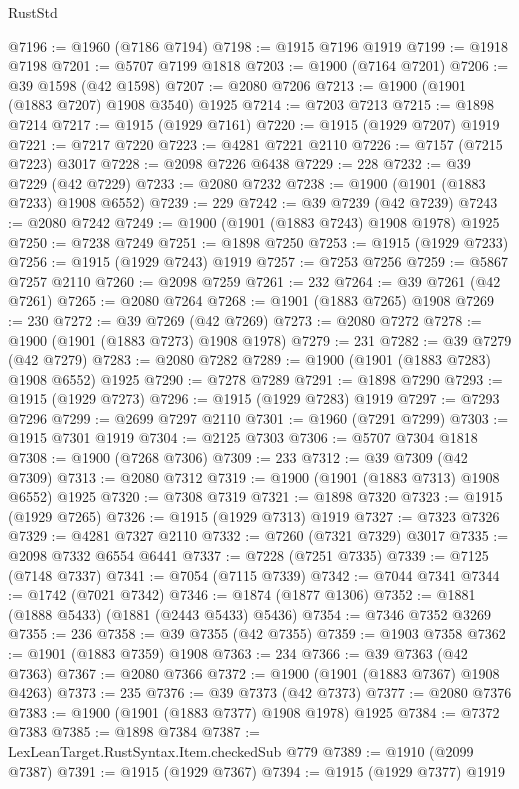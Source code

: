 \begin{lexlean}{RustStd}
\begin{coremodule}
{\begin{coremodule}
{{{{{{{{{{{{{{{{{{{{{{{{{{{{{{{{{{{{{{{{{{{@7196 := @1960 (@7186 @7194)
@7198 := @1915 @7196 @1919
@7199 := @1918 @7198
@7201 := @5707 @7199 @1818
@7203 := @1900 (@7164 @7201)
@7206 := @39 @1598 (@42 @1598)
@7207 := @2080 @7206
@7213 := @1900 (@1901 (@1883 @7207) @1908 @3540) @1925
@7214 := @7203 @7213
@7215 := @1898 @7214
@7217 := @1915 (@1929 @7161)
@7220 := @1915 (@1929 @7207) @1919
@7221 := @7217 @7220
@7223 := @4281 @7221 @2110
@7226 := @7157 (@7215 @7223) @3017
@7228 := @2098 @7226 @6438
@7229 := 228
@7232 := @39 @7229 (@42 @7229)
@7233 := @2080 @7232
@7238 := @1900 (@1901 (@1883 @7233) @1908 @6552)
@7239 := 229
@7242 := @39 @7239 (@42 @7239)
@7243 := @2080 @7242
@7249 := @1900 (@1901 (@1883 @7243) @1908 @1978) @1925
@7250 := @7238 @7249
@7251 := @1898 @7250
@7253 := @1915 (@1929 @7233)
@7256 := @1915 (@1929 @7243) @1919
@7257 := @7253 @7256
@7259 := @5867 @7257 @2110
@7260 := @2098 @7259
@7261 := 232
@7264 := @39 @7261 (@42 @7261)
@7265 := @2080 @7264
@7268 := @1901 (@1883 @7265) @1908
@7269 := 230
@7272 := @39 @7269 (@42 @7269)
@7273 := @2080 @7272
@7278 := @1900 (@1901 (@1883 @7273) @1908 @1978)
@7279 := 231
@7282 := @39 @7279 (@42 @7279)
@7283 := @2080 @7282
@7289 := @1900 (@1901 (@1883 @7283) @1908 @6552) @1925
@7290 := @7278 @7289
@7291 := @1898 @7290
@7293 := @1915 (@1929 @7273)
@7296 := @1915 (@1929 @7283) @1919
@7297 := @7293 @7296
@7299 := @2699 @7297 @2110
@7301 := @1960 (@7291 @7299)
@7303 := @1915 @7301 @1919
@7304 := @2125 @7303
@7306 := @5707 @7304 @1818
@7308 := @1900 (@7268 @7306)
@7309 := 233
@7312 := @39 @7309 (@42 @7309)
@7313 := @2080 @7312
@7319 := @1900 (@1901 (@1883 @7313) @1908 @6552) @1925
@7320 := @7308 @7319
@7321 := @1898 @7320
@7323 := @1915 (@1929 @7265)
@7326 := @1915 (@1929 @7313) @1919
@7327 := @7323 @7326
@7329 := @4281 @7327 @2110
@7332 := @7260 (@7321 @7329) @3017
@7335 := @2098 @7332 @6554 @6441
@7337 := @7228 (@7251 @7335)
@7339 := @7125 (@7148 @7337)
@7341 := @7054 (@7115 @7339)
@7342 := @7044 @7341
@7344 := @1742 (@7021 @7342)
@7346 := @1874 (@1877 @1306)
@7352 := @1881 (@1888 @5433) (@1881 (@2443 @5433) @5436)
@7354 := @7346 @7352 @3269
@7355 := 236
@7358 := @39 @7355 (@42 @7355)
@7359 := @1903 @7358
@7362 := @1901 (@1883 @7359) @1908
@7363 := 234
@7366 := @39 @7363 (@42 @7363)
@7367 := @2080 @7366
@7372 := @1900 (@1901 (@1883 @7367) @1908 @4263)
@7373 := 235
@7376 := @39 @7373 (@42 @7373)
@7377 := @2080 @7376
@7383 := @1900 (@1901 (@1883 @7377) @1908 @1978) @1925
@7384 := @7372 @7383
@7385 := @1898 @7384
@7387 := LexLeanTarget.RustSyntax.Item.checkedSub @779
@7389 := @1910 (@2099 @7387)
@7391 := @1915 (@1929 @7367)
@7394 := @1915 (@1929 @7377) @1919
}}}}}}}}}}}}}}}}}}}}}}}}}}}}}}}}}}}}}}}}}}}
\end{coremodule}}
\end{coremodule}
\end{lexlean}
